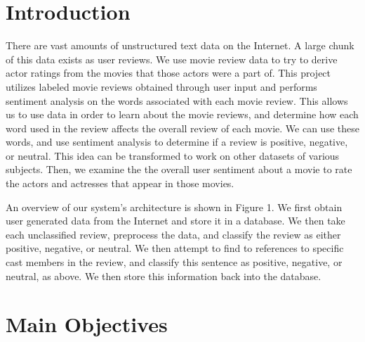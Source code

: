 \documentclass[a0,portrait]{a0poster}
\begin{document}
\begin{multicols}{2} %

\color{DarkSlateGray} %

\section*{Introduction}

There are vast amounts of unstructured text data on the Internet.  A large chunk of this data exists as user reviews. We use movie review data to try to derive actor ratings from the movies that those actors were a part of.  This project utilizes labeled movie reviews obtained through user input and performs sentiment analysis on the words associated with each movie review.  This allows us to use data in order to learn about the movie reviews, and determine how each word used in the review affects the overall review of each movie.  We can use these words, and use sentiment analysis to determine if a review is positive, negative, or neutral.  This idea can be transformed to work on other datasets of various subjects.  Then, we examine the the overall user sentiment about a movie to rate the actors and actresses that appear in those movies. 

An overview of our system's architecture is shown in Figure 1. We first obtain user generated data from the Internet and store it in a database. We then take each unclassified review, preprocess the data, and classify the review as either positive, negative, or neutral. We then attempt to find to references to specific cast members in the review, and classify this sentence as positive, negative, or neutral, as above. We then store this information back into the database. 

\section*{Main Objectives}


\end{multicols}
\end{document}
